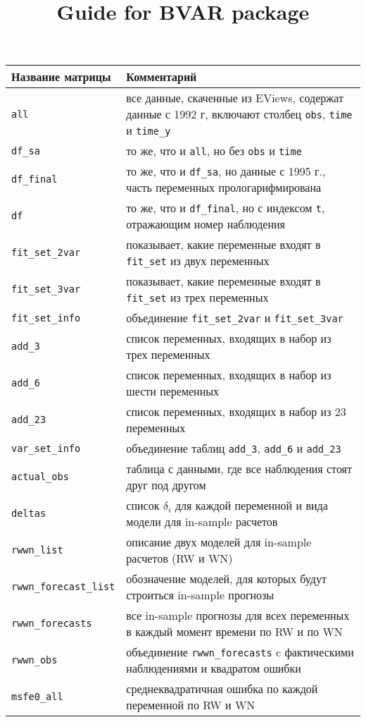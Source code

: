 \documentclass[11pt]{article} %
\title{Guide for BVAR package}
\begin{document}
\begin{center}
\begin{table}[h!]
\begin{tabular}{lp{10cm}}
\toprule
Название матрицы & Комментарий \\
\midrule
 \verb|all| & все данные, скаченные из EViews, содержат данные с 1992 г, включают столбец \verb|obs|, \verb|time| и \verb|time_y|\\
 \verb|df_sa| & то же, что и \verb|all|, но без \verb|obs| и \verb|time|\\
 \verb|df_final| & то же, что и \verb|df_sa|, но данные с 1995 г., часть переменных прологарифмирована\\ 
 \verb|df| & то же, что и \verb|df_final|, но с индексом \verb|t|, отражающим номер наблюдения\\
\midrule
 \verb|fit_set_2var| & показывает, какие переменные входят в \verb|fit_set| из двух переменных\\
 \verb|fit_set_3var| & показывает, какие переменные входят в \verb|fit_set| из трех переменных\\
 \verb|fit_set_info| & объединение \verb|fit_set_2var| и \verb|fit_set_3var| \\
 \verb|add_3| & список переменных, входящих в набор из трех переменных\\
 \verb|add_6| & список переменных, входящих в набор из шести переменных\\
 \verb|add_23| & список переменных, входящих в набор из 23 переменных\\
 \verb|var_set_info| & объединение таблиц \verb|add_3|, \verb|add_6| и \verb|add_23| \\
\midrule
 \verb|actual_obs| & таблица с данными, где все наблюдения стоят друг под другом\\
 \verb|deltas| & список $\delta_i$ для каждой переменной и вида модели для in-sample расчетов\\
 \verb|rwwn_list| & описание двух моделей для in-sample расчетов (RW и WN)\\
 \verb|rwwn_forecast_list| & обозначение моделей, для которых будут строиться in-sample прогнозы\\
\midrule
 \verb|rwwn_forecasts| & все in-sample прогнозы для всех переменных в каждый момент времени по RW и по WN\\
 \verb|rwwn_obs| & объединение \verb|rwwn_forecasts| c фактическими наблюдениями и квадратом ошибки\\ 
 \verb|msfe0_all| & среднеквадратичная ошибка по каждой переменной по RW и WN\\

\end{tabular}
\end{table}
\end{center}
\end{document}
